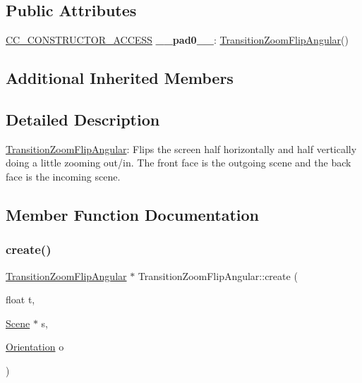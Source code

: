 \subsection*{Public Attributes}
\begin{DoxyCompactItemize}
\item 
\mbox{\label{classTransitionZoomFlipAngular_ad08bbba4c7d0d2f5bf31b09cf8ed3b95}} 
\hyperlink{_2cocos2d_2cocos_2base_2ccConfig_8h_a25ef1314f97c35a2ed3d029b0ead6da0}{C\+C\+\_\+\+C\+O\+N\+S\+T\+R\+U\+C\+T\+O\+R\+\_\+\+A\+C\+C\+E\+SS} {\bfseries \+\_\+\+\_\+pad0\+\_\+\+\_\+}\+: \hyperlink{classTransitionZoomFlipAngular}{Transition\+Zoom\+Flip\+Angular}()
\end{DoxyCompactItemize}
\subsection*{Additional Inherited Members}


\subsection{Detailed Description}
\hyperlink{classTransitionZoomFlipAngular}{Transition\+Zoom\+Flip\+Angular}\+: Flips the screen half horizontally and half vertically doing a little zooming out/in. The front face is the outgoing scene and the back face is the incoming scene. 

\subsection{Member Function Documentation}
\mbox{\label{classTransitionZoomFlipAngular_a27ffb117d72758cf7a9ec288feef5375}} 
\subsubsection{\texorpdfstring{create()}{create()}\hspace{0.1cm}{\footnotesize\ttfamily [1/4]}}
{\footnotesize\ttfamily \hyperlink{classTransitionZoomFlipAngular}{Transition\+Zoom\+Flip\+Angular} $\ast$ Transition\+Zoom\+Flip\+Angular\+::create (\begin{DoxyParamCaption}\item[{float}]{t,  }\item[{\hyperlink{classScene}{Scene} $\ast$}]{s,  }\item[{\hyperlink{classTransitionScene_a0b2b247806fb10a20de0cbc554210c4d}{Orientation}}]{o }\end{DoxyParamCaption})\hspace{0.3cm}{\ttfamily [static]}}


